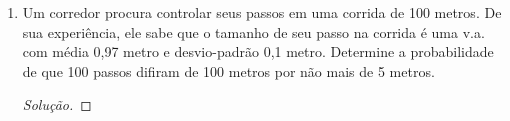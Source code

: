 \documentclass[../Notas.tex]{subfiles}
\begin{document}
\begin{enumerate}
    \begin{enumerate}[a)]
    \item Dê um limite superior para a probabilidade de que a pontuação do estudante excederá 85.
    \item Se, além disso, o professor também saiba que a variância da pontuação do estudante é 25, o que pode ser dito sobre a probabilidade de que o estudante terá uma pontuação entre 65 e 85?
    \end{enumerate}
    \begin{proof}[Solução]
        \begin{enumerate}[a)]
            \item 
        \end{enumerate}
    \end{proof}
    \item Um corredor procura controlar seus passos em uma corrida de 100 metros. De sua experiência, ele sabe que o tamanho de seu passo na corrida é uma v.a. com média 0,97 metro e desvio-padrão 0,1 metro. Determine a probabilidade de que 100 passos difiram de 100 metros por não mais de 5 metros.
    \begin{proof}[Solução]
        
    \end{proof}
\end{enumerate}
\end{document}
